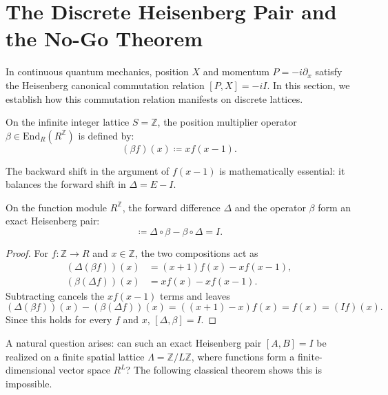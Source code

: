 \section{The Discrete Heisenberg Pair and the No-Go Theorem}

In continuous quantum mechanics, position $X$ and momentum $P = -i \partial_x$ satisfy the Heisenberg canonical commutation relation $[P, X] = -i I$. In this section, we establish how this commutation relation manifests on discrete lattices.

\begin{definition}
On the infinite integer lattice $S = \mathbb{Z}$, the position multiplier operator $\beta \in \mathrm{End}_R(R^\mathbb{Z})$ is defined by:
\begin{equation}
(\beta f)(x) \coloneqq x f(x-1).
\end{equation}
\end{definition}

The backward shift in the argument of $f(x-1)$ is mathematically essential: it balances the forward shift in $\Delta = E - I$.

\begin{theorem}
\label{thm:discrete_heisenberg}
On the function module $R^\mathbb{Z}$, the forward difference $\Delta$ and the operator $\beta$ form an exact Heisenberg pair:
\begin{equation}
[\Delta, \beta] \coloneqq \Delta \circ \beta - \beta \circ \Delta = I.
\end{equation}
\end{theorem}

\begin{proof}
For $f:\mathbb{Z}\to R$ and $x\in\mathbb{Z}$, the two compositions act as
\begin{align}
(\Delta(\beta f))(x)&=(x+1)f(x)-xf(x-1),\\
(\beta(\Delta f))(x)&=xf(x)-xf(x-1).
\end{align}
Subtracting cancels the $xf(x-1)$ terms and leaves
\begin{equation}
(\Delta(\beta f))(x)-(\beta(\Delta f))(x)
=((x+1)-x)f(x)=f(x)=(If)(x).
\end{equation}
Since this holds for every $f$ and $x$, $[\Delta,\beta]=I$.
\end{proof}

A natural question arises: can such an exact Heisenberg pair $[A, B] = I$ be realized on a finite spatial lattice $\Lambda = \mathbb{Z}/L\mathbb{Z}$, where functions form a finite-dimensional vector space $R^L$? The following classical theorem shows this is impossible.

